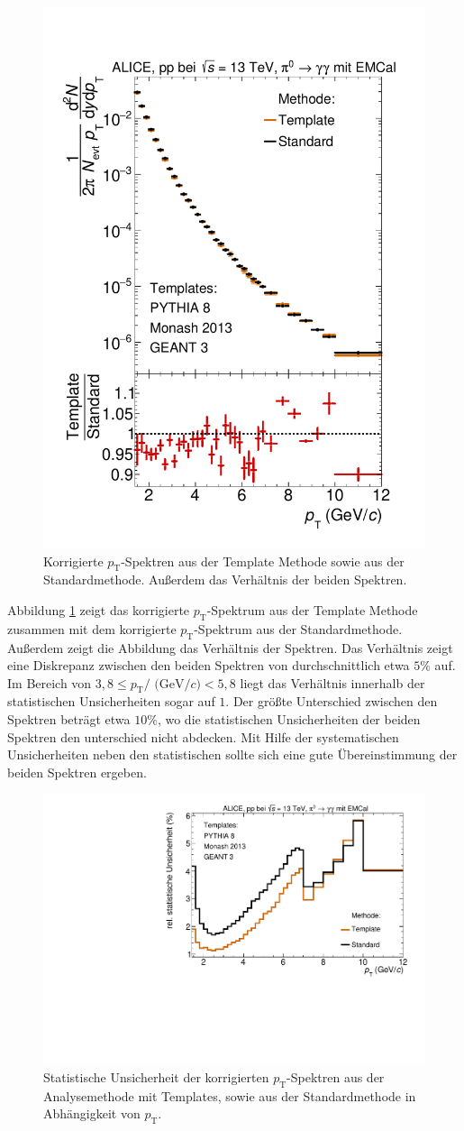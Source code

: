 \begin{figure}[t!]
\centering
\includegraphics[width=.65\linewidth]{KorrigierteYields_Data_2016.pdf}
\caption{Korrigierte $p_\text{T}$-Spektren aus der Template Methode sowie aus der Standardmethode.
Außerdem das Verhältnis der beiden Spektren.}
\label{fig:KorrYieldComp}
\end{figure}
Abbildung \ref{fig:KorrYieldComp} zeigt das korrigierte $p_\text{T}$-Spektrum aus der Template Methode zusammen mit dem korrigierte $p_\text{T}$-Spektrum aus der Standardmethode.
Außerdem zeigt die Abbildung das Verhältnis der Spektren.
Das Verhältnis zeigt eine Diskrepanz zwischen den beiden Spektren von durchschnittlich etwa $5\%$ auf.
Im Bereich von $3,8 \leq p_\text{T}/\text{ (GeV}/c) < 5,8$ liegt das Verhältnis innerhalb der statistischen Unsicherheiten sogar auf $1$.
Der größte Unterschied zwischen den Spektren beträgt etwa $10\%$, wo die statistischen Unsicherheiten der beiden Spektren den unterschied nicht abdecken.
Mit Hilfe der systematischen Unsicherheiten neben den statistischen sollte sich eine gute Übereinstimmung der beiden Spektren ergeben.
\begin{figure}[t!]
\centering
\includegraphics[width=.65\linewidth]{StatistischeUnsicherheitVergleich_Data_2016.pdf}
\caption{Statistische Unsicherheit der korrigierten $p_\text{T}$-Spektren aus der Analysemethode mit Templates, sowie aus der Standardmethode in Abhängigkeit von $p_\text{T}$.}
\label{fig:StatUncer}
\end{figure}
